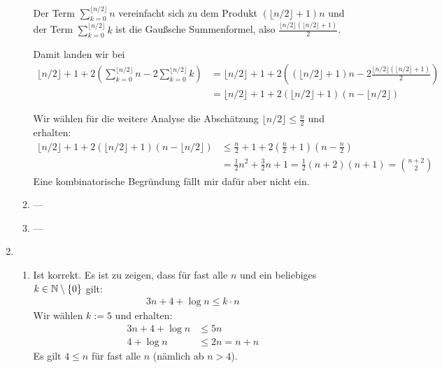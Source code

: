 \begin{enumerate}
\begin{enumerate}
        Der Term
        $\sum\limits_{k=0}^{\lfloor n/2 \rfloor} n$
        vereinfacht sich zu dem Produkt
        $\left( \lfloor n/2 \rfloor + 1 \right) n$
        und der Term
        $\sum\limits_{k=0}^{\lfloor n/2 \rfloor} k$
        ist die Gaußsche Summenformel, also
        $\frac{\lfloor n/2 \rfloor \left(\lfloor n/2 \rfloor + 1\right)}{2}$.

        Damit landen wir bei
        \begin{align*}
          \lfloor n/2 \rfloor + 1 + 2
            \left(
              \sum\limits_{k=0}^{\lfloor n/2 \rfloor} n
              - 2 \sum\limits_{k=0}^{\lfloor n/2 \rfloor} k
            \right)
          & = \lfloor n/2 \rfloor + 1 + 2
            \left(
              \left( \lfloor n/2 \rfloor + 1 \right) n
              - 2
              \frac{\lfloor n/2 \rfloor \left(\lfloor n/2 \rfloor + 1\right)}{2}
            \right)\\
          & = \lfloor n/2 \rfloor + 1 + 2
            \left( \lfloor n/2 \rfloor + 1 \right)
            \left( n - \lfloor n/2 \rfloor \right)
        \end{align*}

        Wir wählen für die weitere Analyse die Abschätzung
        $\lfloor n/2 \rfloor \leq \frac{n}{2}$
        und erhalten:
        \begin{align*}
          \lfloor n/2 \rfloor + 1 + 2
            \left( \lfloor n/2 \rfloor + 1 \right)
            \left( n - \lfloor n/2 \rfloor \right)
          & \leq \frac{n}{2} + 1 + 2
            \left( \frac{n}{2} + 1 \right)
            \left( n - \frac{n}{2} \right)\\
          & = \frac{1}{2} n^2 + \frac{3}{2} n + 1
            = \frac{1}{2} (n+2) (n+1)
            = \binom{n+2}{2}
        \end{align*}
        Eine kombinatorische Begründung fällt mir dafür aber nicht ein.

      \item --- %

      \item ---
    \end{enumerate}

    \item \begin{enumerate}
      \item Ist korrekt. Es ist zu zeigen, dass für fast alle $n$ und ein
        beliebiges $k \in \mathbb{N} \setminus \{ 0 \}$ gilt:
        \begin{align*}
          3n + 4 + \log n \leq k \cdot n
        \end{align*}
        Wir wählen $k := 5$ und erhalten:
        \begin{align*}
          3n + 4 + \log n & \leq 5n\\
          4 + \log n & \leq 2n = n + n
        \end{align*}
        Es gilt $4 \leq n$ für fast alle $n$ (nämlich ab $n > 4$).


\end{enumerate}
\end{enumerate}

